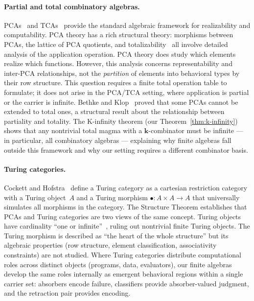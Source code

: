 \documentclass[sigconf,screen]{acmart}
\theoremstyle{remark}
\begin{document}
\paragraph{Partial and total combinatory algebras.}
PCAs~\cite{vanoosten08,longley15} and TCAs~\cite{bethke88} provide the standard algebraic framework for realizability and computability. PCA theory has a rich structural theory: morphisms between PCAs, the lattice of PCA quotients, and totalizability~\cite{bethke96} all involve detailed analysis of the application operation. PCA theory does study which elements realize which functions. However, this analysis concerns representability and inter-PCA relationships, not the \emph{partition} of elements into behavioral types by their row structure. This question requires a finite total operation table to formulate; it does not arise in the PCA/TCA setting, where application is partial or the carrier is infinite. Bethke and Klop~\cite{bethke96} proved that some PCAs cannot be extended to total ones, a structural result about the relationship between partiality and totality. The K-infinity theorem (our Theorem~\ref{thm:k-infinity}) shows that any nontrivial total magma with a $\mathbf{k}$-combinator must be infinite --- in particular, all combinatory algebras --- explaining why finite algebras fall outside this framework and why our setting requires a different combinator basis.

\paragraph{Turing categories.}
Cockett and Hofstra~\cite{cockett08} define a Turing category as a cartesian restriction category with a Turing object~$A$ and a Turing morphism $\bullet : A \times A \to A$ that universally simulates all morphisms in the category. The Structure Theorem establishes that PCAs and Turing categories are two views of the same concept. Turing objects have cardinality ``one or infinite''~\cite{cockett08}, ruling out nontrivial finite Turing objects. The Turing morphism is described as ``the heart of the whole structure'' but its algebraic properties (row structure, element classification, associativity constraints) are not studied. Where Turing categories distribute computational roles across distinct objects (programs, data, evaluators), our finite algebras develop the same roles internally as emergent behavioral regions within a single carrier set: absorbers encode failure, classifiers provide absorber-valued judgment, and the retraction pair provides encoding.
\end{document}
